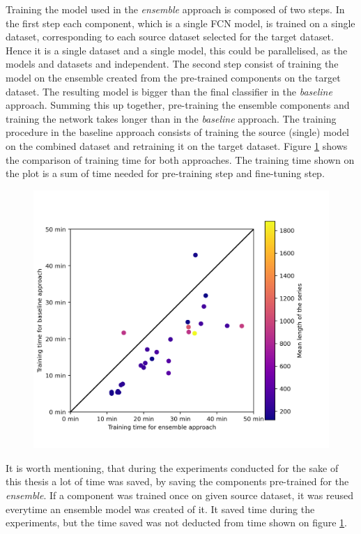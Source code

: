 \documentclass[a4paper,11pt,twoside]{report}
\theoremstyle{definition}
\begin{document}
Training the model used in the \textit{ensemble} approach is composed of two steps. In the first step each component, which is a single FCN model, is trained on a single dataset, corresponding to each source dataset selected for the target dataset. Hence it is a single dataset and a single model, this could be parallelised, as the models and datasets and independent. The second step consist of training the model on the ensemble created from the pre-trained components on the target dataset. The resulting model is bigger than the final classifier in the \textit{baseline} approach. Summing this up together, pre-training the ensemble components and training the network takes longer than in the \textit{baseline} approach. The training procedure in the baseline approach consists of training the source (single) model on the combined dataset and retraining it on the target dataset.
Figure \ref{fig:baseline_ensemble_traning_time} shows the comparison of training time for both approaches.  The training time shown on the plot is a sum of time needed for pre-training step and fine-tuning step.
\FloatBarrier
\begin{figure}[h!t]
\centering
\includegraphics[width=17cm]{imgs/baseline_vs_ensemble/times_comparison.png}
\caption{}
\label{fig:baseline_ensemble_traning_time}
\end{figure}
\FloatBarrier
It is worth mentioning, that during the experiments conducted for the sake of this thesis a lot of time was saved, by saving the components pre-trained for the \textit{ensemble}. If a component was trained once on given source dataset, it was reused everytime an ensemble model was created of it. It saved time during the experiments, but the time saved was not deducted from time shown on figure \ref{fig:baseline_ensemble_traning_time}.
\end{document}
